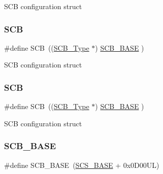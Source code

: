 S\+CB configuration struct \mbox{\label{group___c_m_s_i_s__core__base_gaaaf6477c2bde2f00f99e3c2fd1060b01}} 
\subsubsection{\texorpdfstring{S\+CB}{SCB}\hspace{0.1cm}{\footnotesize\ttfamily [6/7]}}
{\footnotesize\ttfamily \#define S\+CB~((\mbox{\hyperlink{struct_s_c_b___type}{S\+C\+B\+\_\+\+Type}}       $\ast$)     \mbox{\hyperlink{group___c_m_s_i_s__core__base_gad55a7ddb8d4b2398b0c1cfec76c0d9fd}{S\+C\+B\+\_\+\+B\+A\+SE}}      )}

S\+CB configuration struct \mbox{\label{group___c_m_s_i_s__core__base_gaaaf6477c2bde2f00f99e3c2fd1060b01}} 
\subsubsection{\texorpdfstring{S\+CB}{SCB}\hspace{0.1cm}{\footnotesize\ttfamily [7/7]}}
{\footnotesize\ttfamily \#define S\+CB~((\mbox{\hyperlink{struct_s_c_b___type}{S\+C\+B\+\_\+\+Type}}       $\ast$)     \mbox{\hyperlink{group___c_m_s_i_s__core__base_gad55a7ddb8d4b2398b0c1cfec76c0d9fd}{S\+C\+B\+\_\+\+B\+A\+SE}}      )}

S\+CB configuration struct \mbox{\label{group___c_m_s_i_s__core__base_gad55a7ddb8d4b2398b0c1cfec76c0d9fd}} 
\subsubsection{\texorpdfstring{S\+C\+B\+\_\+\+B\+A\+SE}{SCB\_BASE}\hspace{0.1cm}{\footnotesize\ttfamily [1/7]}}
{\footnotesize\ttfamily \#define S\+C\+B\+\_\+\+B\+A\+SE~(\mbox{\hyperlink{group___c_m_s_i_s__core__base_ga3c14ed93192c8d9143322bbf77ebf770}{S\+C\+S\+\_\+\+B\+A\+SE}} +  0x0\+D00\+U\+L)}

